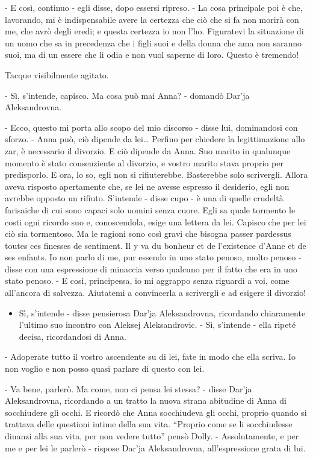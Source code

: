- E così, continuo - egli disse, dopo essersi ripreso. - La cosa principale poi è che, lavorando, mi è indispensabile avere la certezza che ciò che si fa non morirà con me, che avrò degli eredi; e questa certezza io non l'ho. Figuratevi la situazione di un uomo che sa in precedenza che i figli suoi e della donna che ama non saranno suoi, ma di un essere che li odia e non vuol saperne di loro. Questo è tremendo! 

Tacque visibilmente agitato. 

- Sì, s'intende, capisco. Ma cosa può mai Anna? - domandò Dar'ja Aleksandrovna. 

- Ecco, questo mi porta allo scopo del mio discorso - disse lui, dominandosi con sforzo. - Anna può, ciò dipende da lei\ldots{} Perfino per chiedere la legittimazione allo zar, è necessario il divorzio. E ciò dipende da Anna. Suo marito in qualunque momento è stato consenziente al divorzio, e vostro marito stava proprio per predisporlo. E ora, lo so, egli non si rifiuterebbe. Basterebbe solo scrivergli. Allora aveva risposto apertamente che, se lei ne avesse espresso il desiderio, egli non avrebbe opposto un rifiuto. S'intende - disse cupo - è una di quelle crudeltà farisaiche di cui sono capaci solo uomini senza cuore. Egli sa quale tormento le costi ogni ricordo suo e, conoscendola, esige una lettera da lei. Capisco che per lei ciò sia tormentoso. Ma le ragioni sono così gravi che bisogna passer pardessus toutes ces finesses de sentiment. Il y va du bonheur et de l'existence d'Anne et de ses enfants. Io non parlo di me, pur essendo in uno stato penoso, molto penoso - disse con una espressione di minaccia verso qualcuno per il fatto che era in uno stato penoso. - E così, principessa, io mi aggrappo senza riguardi a voi, come all'ancora di salvezza. Aiutatemi a convincerla a scrivergli e ad esigere il divorzio! 

\begin{itemize} \itemsep1pt\parskip0pt \item Sì, s'intende - disse pensierosa Dar'ja Aleksandrovna, ricordando chiaramente l'ultimo suo incontro con Aleksej Aleksandrovic. - Sì, s'intende - ella ripeté decisa, ricordandosi di Anna. \end{itemize} 

- Adoperate tutto il vostro ascendente su di lei, fate in modo che ella scriva. Io non voglio e non posso quasi parlare di questo con lei. 

- Va bene, parlerò. Ma come, non ci pensa lei stessa? - disse Dar'ja Aleksandrovna, ricordando a un tratto la nuova strana abitudine di Anna di socchiudere gli occhi. E ricordò che Anna socchiudeva gli occhi, proprio quando si trattava delle questioni intime della sua vita. ``Proprio come se li socchiudesse dinanzi alla sua vita, per non vedere tutto'' pensò Dolly. - Assolutamente, e per me e per lei le parlerò - rispose Dar'ja Aleksandrovna, all'espressione grata di lui. 

